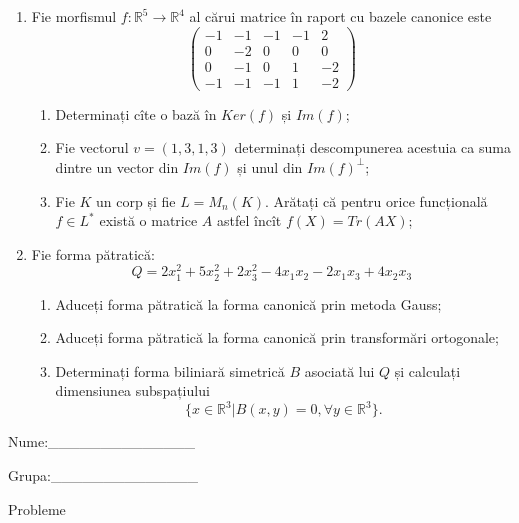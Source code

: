 \documentclass{article}
\begin{document}
\begin{enumerate}
 \item Fie morfismul $f:\mathbb{R}^5 \to \mathbb{R}^4$ al cărui matrice în raport cu bazele canonice este
$$\begin{pmatrix}
-1&-1&-1&-1&2\\
0&-2&0&0&0\\
0&-1&0&1&-2\\
-1&-1&-1&1&-2
\end{pmatrix}$$

\begin{enumerate}
\item Determinați cîte o bază în $Ker(f)$ și $Im(f)$;
\item Fie vectorul $v=(1,3,1,3)$ determinați descompunerea acestuia ca suma dintre un vector din $Im(f)$ și unul din $Im(f)^\perp$;
\item Fie $K$ un corp și fie $L=M_n(K)$. Arătați că pentru orice funcțională $f \in L^*$ există o matrice $A$ astfel încît $f(X)=Tr(AX)$;
\end{enumerate}
\item Fie forma pătratică:
$$Q= 2x_1^2+5x_2^2+2x_3^2-4x_1x_2-2x_1x_3+4x_2x_3$$

\begin{enumerate}
\item Aduceți forma pătratică la forma canonică prin metoda Gauss;
\item Aduceți forma pătratică la forma canonică prin transformări ortogonale;
\item Determinați forma biliniară simetrică $B$ asociată lui $Q$ și calculați dimensiunea subspațiului
$$\{x \in \mathbb{R}^3 | B(x,y)=0,\forall y \in \mathbb{R}^3\}.$$

\end{enumerate}
\end{enumerate}
\newpage
\begin{flushright}
Nume:\_\_\_\_\_\_\_\_\_\_\_\_\_\_
 
 
Grupa:\_\_\_\_\_\_\_\_\_\_\_\_\_\_
\end{flushright}
\begin{center}
\vspace{2cm}
{\Large Probleme}
\vspace{2cm}
\end{center}
\end{document}
